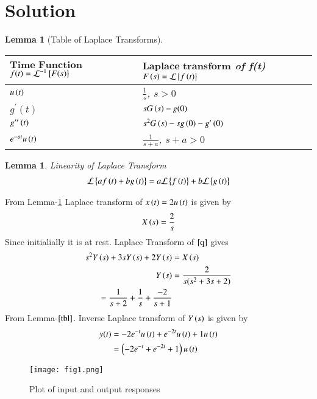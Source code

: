 \documentclass[journal,12pt,twocolumn]{IEEEtran}
\newtheorem{lemma}[theorem]{Lemma}
\begin{document}
\section{Solution}
\begin{lemma}[Table of Laplace Transforms]\label{tbl}
\begin{center}
\begin{tabular}{ |m{3cm}|m{4.5cm}| } 
 \hline
 $\textbf{Time Function}$ $f(t)=\mathcal{L}^{-1}\left\{F(s)\right\}$ & $\textbf{Laplace transform}$ of f(t) $F\left(s\right)=\mathcal{L}\left\{f\left(t\right)\right\}$ \\ 
 \hline
 $u\left(t\right)$ & $\frac{1}{s}$, $s>0$ \\ 
 \hline
 $g^{\prime}(t)$ & $sG\left(s\right)-g(0)$ \\ 
 \hline
 $g^{\prime\prime}\left(t\right)$ & $s^2G\left(s\right)-sg\left(0\right)-g^{\prime}\left(0\right)$\\
 \hline
 $e^{-at}u\left(t\right)$ & $\frac{1}{s+a}$, $s+a>0$\\
 \hline
\end{tabular}
\end{center}
\end{lemma}
\begin{lemma}{Linearity of Laplace Transform}
\begin{align}
    \mathcal{L}\left\{af\left(t\right)+bg\left(t\right)\right\}=a\mathcal{L}\left\{f\left(t\right)\right\}+b\mathcal{L}\left\{g\left(t\right)\right\}
\end{align}
\end{lemma}
From Lemma-\ref{tbl} Laplace transform of $x\left(t\right)=2u\left(t\right)$ is given by
\begin{align}
    X\left(s\right)=\frac{2}{s}
\end{align}
Since initialially it is at rest. Laplace Transform of $\eqref{q}$ gives
\begin{align}
    s^{2}Y\left(s\right)+3sY\left(s\right)+2Y\left(s\right)&=X\left(s\right) \label{equation}\\
    Y\left(s\right)&=\frac{2}{s(s^2+3s+2)}\\
    = \frac{1}{s+2}+\frac{1}{s}+ \frac{-2}{s+1}\label{hc}\\
\end{align}
From Lemma-$\ref{tbl}$. Inverse Laplace transform of $Y\left(s\right)$ is given by
\begin{align}
    y(t)&=-2e^{-t}u\left(t\right)+e^{-2t}u\left(t\right)+1 u\left(t\right)\\
    &=\left(-2e^{-t}+e^{-2t}+1\right)u\left(t\right)
\end{align}
\begin{figure}[htp]
    \centering
    \texttt{[image: fig1.png]}
    \caption{Plot of input and output responses }
    \label{fig:my_label}
\end{figure}
\end{document}
